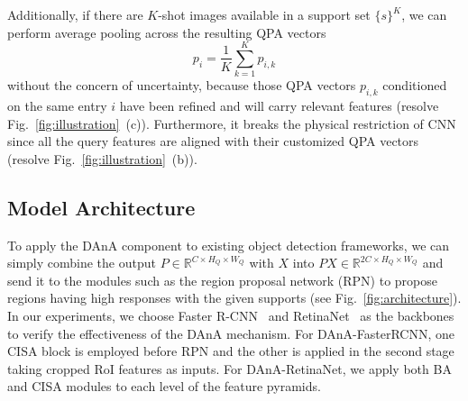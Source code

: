 \documentclass[journal]{IEEEtran}
\begin{document}
Additionally, if there are $K$-shot images available in a support set $\{s\}^K$, we can perform average pooling across the resulting QPA vectors
\begin{equation} \label{eq:multishot_in_dana}
    p_i = \frac{1}{K} \sum_{k=1}^K p_{i, k} 
\end{equation}
without the concern of uncertainty, because those QPA vectors $p_{i, k}$ conditioned on the same entry $i$ have been refined and will carry relevant features (resolve Fig.~\ref{fig:illustration}~(c)).
Furthermore, it breaks the physical restriction of CNN since all the query features are aligned with their customized QPA vectors (resolve Fig.~\ref{fig:illustration}~(b)). 


\subsection{Model Architecture}
\label{section:model_architecture}
To apply the DAnA component to existing object detection frameworks, we can simply combine the output $P\in\mathbb{R}^{C\times H_Q\times W_Q}$ with $X$ into $PX\in\mathbb{R}^{2C\times H_Q\times W_Q}$ and send it to the modules such as the region proposal network (RPN) to propose regions having high responses with the given supports (see Fig.~\ref{fig:architecture}).
In our experiments, we choose Faster R-CNN~\cite{ren2015faster} and RetinaNet~\cite{lin2017focal} as the backbones to verify the effectiveness of the DAnA mechanism.
For DAnA-FasterRCNN, one CISA block is employed before RPN and the other is applied in the second stage taking cropped RoI features as inputs.
For DAnA-RetinaNet, we apply both BA and CISA modules to each level of the feature pyramids.
\end{document}
